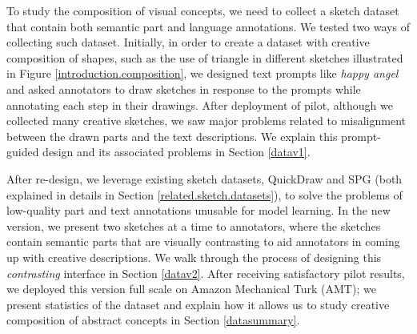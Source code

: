 To study the composition of visual concepts, we need to collect a sketch dataset that contain both semantic part and language annotations. We tested two ways of collecting such dataset. Initially, in order to create a dataset with creative composition of shapes, such as the use of triangle in different sketches illustrated in Figure \ref{introduction.composition}, we designed text prompts like \textit{happy angel} and asked annotators to draw sketches in response to the prompts while annotating each step in their drawings.  
After deployment of pilot, although we collected many creative sketches, we saw major problems related to misalignment between the drawn parts and the text descriptions. We explain this prompt-guided design and its associated problems in Section \ref{datav1}.    

After re-design, we leverage existing sketch datasets, QuickDraw and SPG (both explained in details in Section \ref{related.sketch.datasets}), to solve the problems of low-quality part and text annotations unusable for model learning.    
In the new version, we present two sketches at a time to annotators, where the sketches contain semantic parts that are visually contrasting to aid annotators in coming up with creative descriptions. We walk through the process of designing this \textit{contrasting} interface in Section \ref{datav2}. After receiving satisfactory pilot results, we deployed this version full scale on Amazon Mechanical Turk (AMT); we present statistics of the dataset and explain how it allows us to study creative composition of abstract concepts in Section \ref{datasummary}. 


